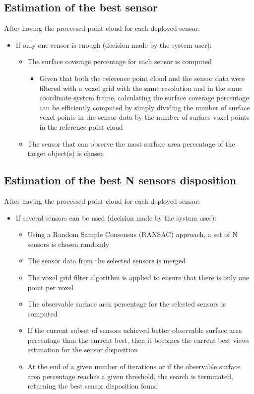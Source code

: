 \subsection{Estimation of the best sensor}

After having the processed point cloud for each deployed sensor:
\begin{itemize}
	\item If only one sensor is enough (decision made by the system user):
	\begin{itemize}
		\item The surface coverage percentage for each sensor is computed
		\begin{itemize}
			\item Given that both the reference point cloud and the sensor data were filtered with a voxel grid with the same resolution and in the same coordinate system frame, calculating the surface coverage percentage can be efficiently computed by simply dividing the number of surface voxel points in the sensor data by the number of surface voxel points in the reference point cloud
		\end{itemize}
			\item The sensor that can observe the most surface area percentage of the target object(s) is chosen
	\end{itemize}
\end{itemize}


\subsection{Estimation of the best N sensors disposition}

After having the processed point cloud for each deployed sensor:
\begin{itemize}
	\item If several sensors can be used (decision made by the system user):
	\begin{itemize}
		\item Using a Random Sample Consensus (RANSAC) approach, a set of N sensors is chosen randomly
		\item The sensor data from the selected sensors is merged
		\item The voxel grid filter algorithm is applied to ensure that there is only one point per voxel
		\item The observable surface area percentage for the selected sensors is computed
		\item If the current subset of sensors achieved better observable surface area percentage than the current best, then it becomes the current best views estimation for the sensor disposition
		\item At the end of a given number of iterations or if the observable surface area percentage reaches a given threshold, the search is terminated, returning the best sensor disposition found
	\end{itemize}
\end{itemize}

